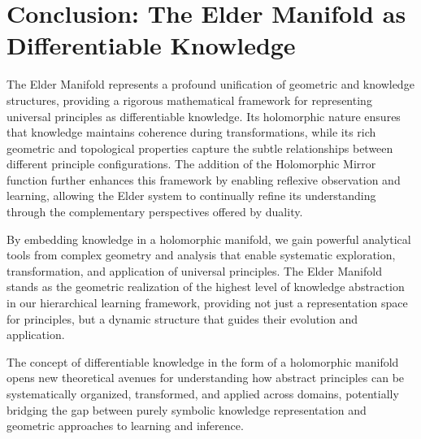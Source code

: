 \section{Conclusion: The Elder Manifold as Differentiable Knowledge}

The Elder Manifold represents a profound unification of geometric and knowledge structures, providing a rigorous mathematical framework for representing universal principles as differentiable knowledge. Its holomorphic nature ensures that knowledge maintains coherence during transformations, while its rich geometric and topological properties capture the subtle relationships between different principle configurations. The addition of the Holomorphic Mirror function further enhances this framework by enabling reflexive observation and learning, allowing the Elder system to continually refine its understanding through the complementary perspectives offered by duality.

By embedding knowledge in a holomorphic manifold, we gain powerful analytical tools from complex geometry and analysis that enable systematic exploration, transformation, and application of universal principles. The Elder Manifold stands as the geometric realization of the highest level of knowledge abstraction in our hierarchical learning framework, providing not just a representation space for principles, but a dynamic structure that guides their evolution and application.

The concept of differentiable knowledge in the form of a holomorphic manifold opens new theoretical avenues for understanding how abstract principles can be systematically organized, transformed, and applied across domains, potentially bridging the gap between purely symbolic knowledge representation and geometric approaches to learning and inference.